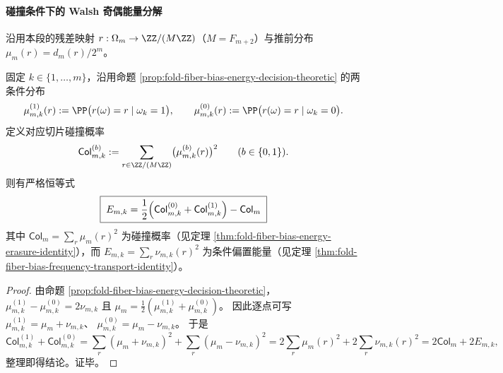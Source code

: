 
\paragraph{碰撞条件下的 Walsh 奇偶能量分解}
沿用本段的残差映射 \(r:\Omega_m\to \ZZ/(M\ZZ)\)（\(M=F_{m+2}\)）与推前分布 \(\mu_m(r)=d_m(r)/2^m\)。

\begin{corollary}\label{cor:fold-fiber-slice-collision-decomposition}
固定 \(k\in\{1,\dots,m\}\)，沿用命题 \ref{prop:fold-fiber-bias-energy-decision-theoretic} 的两条件分布
\[
\mu_{m,k}^{(1)}(r):=\PP\bigl(r(\omega)=r\mid \omega_k=1\bigr),
\qquad
\mu_{m,k}^{(0)}(r):=\PP\bigl(r(\omega)=r\mid \omega_k=0\bigr).
\]
定义对应切片碰撞概率
\[
\mathsf{Col}^{(b)}_{m,k}:=\sum_{r\in\ZZ/(M\ZZ)}\bigl(\mu^{(b)}_{m,k}(r)\bigr)^2
\qquad(b\in\{0,1\}).
\]
则有严格恒等式
\[
\boxed{\;
E_{m,k}=\frac12\Bigl(\mathsf{Col}^{(0)}_{m,k}+\mathsf{Col}^{(1)}_{m,k}\Bigr)-\mathsf{Col}_m\;}
\]
其中 \(\mathsf{Col}_m=\sum_r\mu_m(r)^2\) 为碰撞概率（见定理 \ref{thm:fold-fiber-bias-energy-erasure-identity}），而 \(E_{m,k}=\sum_r\nu_{m,k}(r)^2\) 为条件偏置能量（见定理 \ref{thm:fold-fiber-bias-frequency-transport-identity}）。
\end{corollary}
\begin{proof}
由命题 \ref{prop:fold-fiber-bias-energy-decision-theoretic}，
\(
\mu_{m,k}^{(1)}-\mu_{m,k}^{(0)}=2\nu_{m,k}
\)
且
\(
\mu_m=\frac12(\mu_{m,k}^{(1)}+\mu_{m,k}^{(0)})
\)。
因此逐点可写
\(
\mu_{m,k}^{(1)}=\mu_m+\nu_{m,k}
\)、
\(
\mu_{m,k}^{(0)}=\mu_m-\nu_{m,k}
\)。
于是
\[
\mathsf{Col}^{(1)}_{m,k}+\mathsf{Col}^{(0)}_{m,k}
=\sum_r(\mu_m+\nu_{m,k})^2+\sum_r(\mu_m-\nu_{m,k})^2
=2\sum_r\mu_m(r)^2+2\sum_r\nu_{m,k}(r)^2
=2\mathsf{Col}_m+2E_{m,k},
\]
整理即得结论。证毕。
\end{proof}

